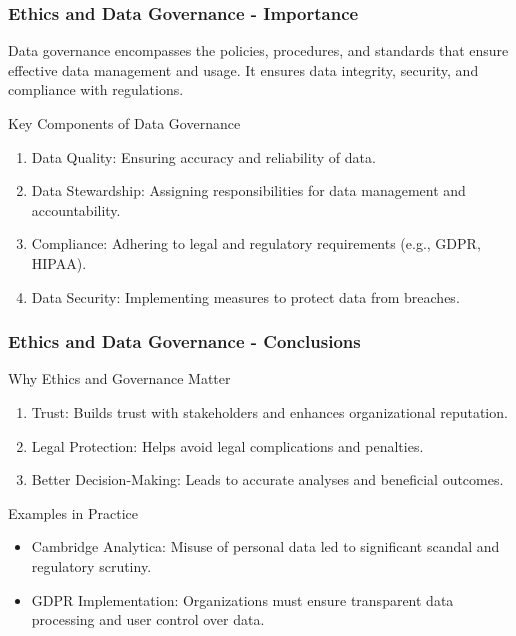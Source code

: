 \documentclass[aspectratio=169]{beamer}
\begin{document}
\begin{frame}[fragile]
    \frametitle{Ethics and Data Governance - Importance}
    Data governance encompasses the policies, procedures, and standards that ensure effective data management and usage. It ensures data integrity, security, and compliance with regulations.

    \begin{block}{Key Components of Data Governance}
        \begin{enumerate}
            \item Data Quality: Ensuring accuracy and reliability of data.
            \item Data Stewardship: Assigning responsibilities for data management and accountability.
            \item Compliance: Adhering to legal and regulatory requirements (e.g., GDPR, HIPAA).
            \item Data Security: Implementing measures to protect data from breaches.
        \end{enumerate}
    \end{block}
\end{frame}

\begin{frame}[fragile]
    \frametitle{Ethics and Data Governance - Conclusions}
    \begin{block}{Why Ethics and Governance Matter}
        \begin{enumerate}
            \item Trust: Builds trust with stakeholders and enhances organizational reputation.
            \item Legal Protection: Helps avoid legal complications and penalties.
            \item Better Decision-Making: Leads to accurate analyses and beneficial outcomes.
        \end{enumerate}
    \end{block}

    \begin{block}{Examples in Practice}
        \begin{itemize}
            \item Cambridge Analytica: Misuse of personal data led to significant scandal and regulatory scrutiny.
            \item GDPR Implementation: Organizations must ensure transparent data processing and user control over data.
        \end{itemize}
    \end{block}
\end{frame}
\end{document}
